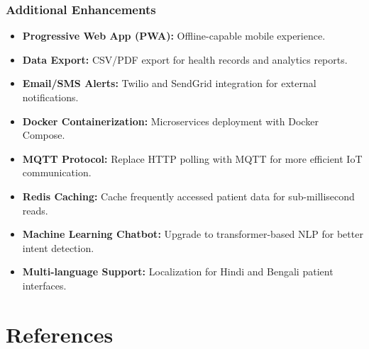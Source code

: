 \documentclass[12pt,a4paper]{report}
\begin{document}
\subsection{Additional Enhancements}
\begin{itemize}[leftmargin=*]
    \item \textbf{Progressive Web App (PWA):} Offline-capable mobile experience.
    \item \textbf{Data Export:} CSV/PDF export for health records and analytics reports.
    \item \textbf{Email/SMS Alerts:} Twilio and SendGrid integration for external notifications.
    \item \textbf{Docker Containerization:} Microservices deployment with Docker Compose.
    \item \textbf{MQTT Protocol:} Replace HTTP polling with MQTT for more efficient IoT communication.
    \item \textbf{Redis Caching:} Cache frequently accessed patient data for sub-millisecond reads.
    \item \textbf{Machine Learning Chatbot:} Upgrade to transformer-based NLP for better intent detection.
    \item \textbf{Multi-language Support:} Localization for Hindi and Bengali patient interfaces.
\end{itemize}

\chapter{References}
\end{document}
